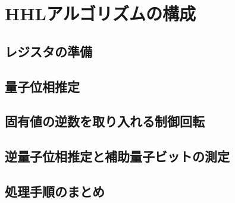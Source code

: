 \section{HHLアルゴリズムの構成}
\label{sec:hhl-algorithm}

\subsection{レジスタの準備}
\label{subsec:hhl-register-preparation}


\subsection{量子位相推定}
\label{subsec:hhl-quantum-phase-estimation}

\subsection{固有値の逆数を取り入れる制御回転}
\label{subsec:hhl-controlled-rotation}

\subsection{逆量子位相推定と補助量子ビットの測定}
\label{subsec:hhl-uncomputation-and-measurement}

\subsection{処理手順のまとめ}
\label{subsec:hhl-procedure-summary}
